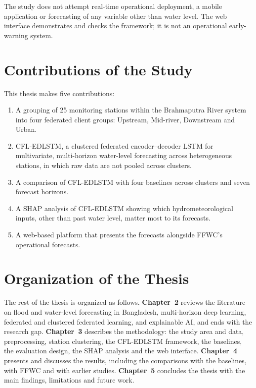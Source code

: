 The study does not attempt real-time operational deployment, a mobile
application or forecasting of any variable other than water level. The web
interface demonstrates and checks the framework; it is not an operational
early-warning system.

\section{Contributions of the Study}
\label{sec:1.11}

This thesis makes five contributions:

\begin{enumerate}
    \item A grouping of 25 monitoring stations within the Brahmaputra River
    system into four federated client groups: Upstream, Mid-river, Downstream
    and Urban.

    \item CFL-EDLSTM, a clustered federated encoder--decoder LSTM for
    multivariate, multi-horizon water-level forecasting across heterogeneous
    stations, in which raw data are not pooled across clusters.

    \item A comparison of CFL-EDLSTM with four baselines across clusters and
    seven forecast horizons.

    \item A SHAP analysis of CFL-EDLSTM showing which hydrometeorological
    inputs, other than past water level, matter most to its forecasts.

    \item A web-based platform that presents the forecasts alongside FFWC's
    operational forecasts.
\end{enumerate}

\section{Organization of the Thesis}
\label{sec:1.12}

The rest of the thesis is organized as follows. \textbf{Chapter~2} reviews the
literature on flood and water-level forecasting in Bangladesh, multi-horizon
deep learning, federated and clustered federated learning, and explainable AI,
and ends with the research gap. \textbf{Chapter~3} describes the methodology:
the study area and data, preprocessing, station clustering, the CFL-EDLSTM
framework, the baselines, the evaluation design, the SHAP analysis and the web
interface. \textbf{Chapter~4} presents and discusses the results, including the
comparisons with the baselines, with FFWC and with earlier studies.
\textbf{Chapter~5} concludes the thesis with the main findings, limitations and
future work.

